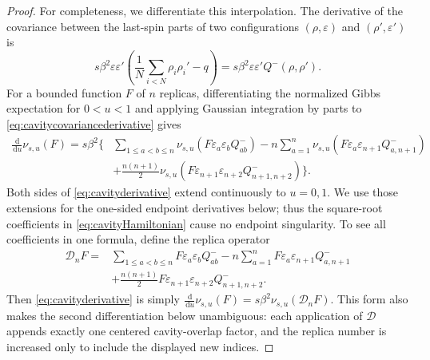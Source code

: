 \documentclass[11pt]{article}
\numberwithin{equation}{section}
\theoremstyle{plain}
\theoremstyle{definition}
\newcommand{\1}{\mathbf 1}
\newcommand{\dd}{\,\mathrm d}
\begin{document}
\begin{proof}
For completeness, we differentiate this interpolation.  The
derivative of the covariance between the last-spin parts of two
configurations $(\rho,\varepsilon)$ and
$(\rho',\varepsilon')$ is
\begin{equation}
 s\beta^2\varepsilon\varepsilon'
 \left(\frac1N\sum_{i<N}\rho_i\rho_i'-q\right)
 =s\beta^2\varepsilon\varepsilon'Q^-(\rho,\rho').
 \label{eq:cavitycovariancederivative}
\end{equation}
For a bounded function $F$ of $n$ replicas, differentiating the
normalized Gibbs expectation for $0<u<1$ and applying Gaussian
integration by parts to \eqref{eq:cavitycovariancederivative} gives
\begin{align}
 \frac{\dd}{\dd u}\nu_{s,u}(F)
 =s\beta^2\Bigg\{&
 \sum_{1\le a<b\le n}
 \nu_{s,u}(F\varepsilon_a\varepsilon_bQ^-_{ab})
 -n\sum_{a=1}^n
 \nu_{s,u}(F\varepsilon_a\varepsilon_{n+1}Q^-_{a,n+1})
 \nonumber\\
 &+\frac{n(n+1)}2
 \nu_{s,u}(F\varepsilon_{n+1}\varepsilon_{n+2}
 Q^-_{n+1,n+2})\Bigg\}.
 \label{eq:cavityderivative}
\end{align}
Both sides of \eqref{eq:cavityderivative} extend continuously to
$u=0,1$.  We use those extensions for the one-sided endpoint
derivatives below; thus the square-root coefficients in
\eqref{eq:cavityHamiltonian} cause no endpoint singularity.
To see all coefficients in one formula, define the replica operator
\begin{align*}
 \mathcal D_nF={}&
 \sum_{1\le a<b\le n}
 F\varepsilon_a\varepsilon_bQ^-_{ab}
 -n\sum_{a=1}^n
 F\varepsilon_a\varepsilon_{n+1}Q^-_{a,n+1}\\
 &+\frac{n(n+1)}2
 F\varepsilon_{n+1}\varepsilon_{n+2}Q^-_{n+1,n+2}.
\end{align*}
Then \eqref{eq:cavityderivative} is simply
$\frac{\dd}{\dd u}\nu_{s,u}(F)
=s\beta^2\nu_{s,u}(\mathcal D_nF)$.  This form also makes the
second differentiation below unambiguous: each application of
$\mathcal D$ appends exactly one centered cavity-overlap factor, and
the replica number is increased only to include the displayed new
indices.


\end{proof}
\end{document}
